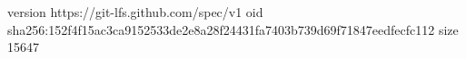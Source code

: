 version https://git-lfs.github.com/spec/v1
oid sha256:152f4f15ac3ca9152533de2e8a28f24431fa7403b739d69f71847eedfecfc112
size 15647
